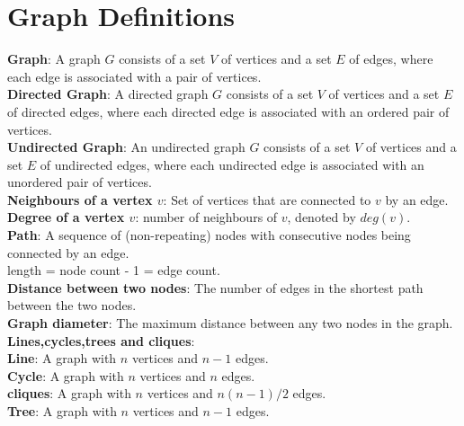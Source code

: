 \documentclass[onecolumn]{report}
\begin{document}
\section{Graph Definitions}
\textbf{Graph}: A graph $G$ consists of a set $V$ of vertices and a set $E$ of edges, where each edge is associated with a pair of vertices.\\
\textbf{Directed Graph}: A directed graph $G$ consists of a set $V$ of vertices and a set $E$ of directed edges, where each directed edge is associated with an ordered pair of vertices.\\
\textbf{Undirected Graph}: An undirected graph $G$ consists of a set $V$ of vertices and a set $E$ of undirected edges, where each undirected edge is associated with an unordered pair of vertices.\\
\textbf{Neighbours of a vertex $v$}: Set of vertices that are connected to $v$ by an edge.\\
\textbf{Degree of a vertex $v$}: number of neighbours of $v$, denoted by $deg(v)$.\\
\textbf{Path}: A sequence of (non-repeating) nodes with consecutive nodes being connected by an edge.\\
length = node count - 1 = edge count.\\
\textbf{Distance between two nodes}: The number of edges in the shortest path between the two nodes.\\
\textbf{Graph diameter}: The maximum distance between any two nodes in the graph.\\

\textbf{Lines,cycles,trees and cliques}:\\
\textbf{Line}: A graph with $n$ vertices and $n-1$ edges.\\
\textbf{Cycle}: A graph with $n$ vertices and $n$ edges.\\
\textbf{cliques}: A graph with $n$ vertices and $n(n-1)/2$ edges.\\
\textbf{Tree}: A graph with $n$ vertices and $n-1$ edges.\\
\end{document}
